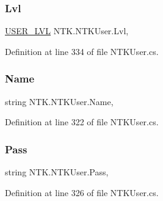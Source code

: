 \mbox{\label{class_n_t_k_1_1_n_t_k_user_ad749af74429eb3196cbb4f25c7ace034}} 
\subsubsection{\texorpdfstring{Lvl}{Lvl}}
{\footnotesize\ttfamily \mbox{\hyperlink{namespace_n_t_k_a1a2136a0cde3a719c9188a4d515e9f1b}{U\+S\+E\+R\+\_\+\+L\+VL}} N\+T\+K.\+N\+T\+K\+User.\+Lvl\hspace{0.3cm}{\ttfamily [get]}, {\ttfamily [set]}}







Definition at line 334 of file N\+T\+K\+User.\+cs.

\mbox{\label{class_n_t_k_1_1_n_t_k_user_a53435983d42170128ede63d0fde30a79}} 
\subsubsection{\texorpdfstring{Name}{Name}}
{\footnotesize\ttfamily string N\+T\+K.\+N\+T\+K\+User.\+Name\hspace{0.3cm}{\ttfamily [get]}, {\ttfamily [set]}}







Definition at line 322 of file N\+T\+K\+User.\+cs.

\mbox{\label{class_n_t_k_1_1_n_t_k_user_a63a05a4e52f73c50fa96552f672b33af}} 
\subsubsection{\texorpdfstring{Pass}{Pass}}
{\footnotesize\ttfamily string N\+T\+K.\+N\+T\+K\+User.\+Pass\hspace{0.3cm}{\ttfamily [get]}, {\ttfamily [set]}}







Definition at line 326 of file N\+T\+K\+User.\+cs.

